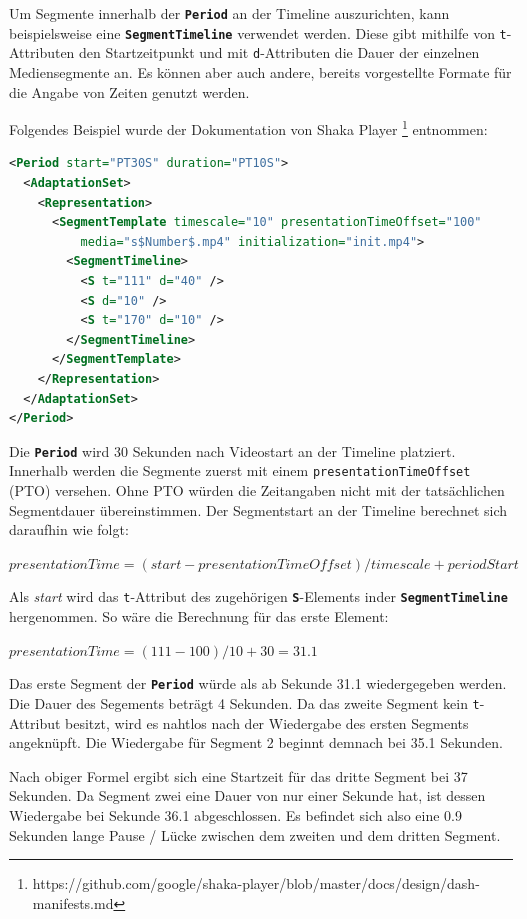 \documentclass[paper = a4, fontsize = 12pt, parskip = half]{scrartcl} %
\def\attr#1{\texttt{#1}}
\def\elem#1{\texttt{\textbf{#1}}}
\begin{document}
Um Segmente innerhalb der \elem{Period} an der Timeline auszurichten, kann beispielsweise eine \elem{SegmentTimeline} verwendet werden. Diese gibt mithilfe von \attr{t}-Attributen den Startzeitpunkt und mit \attr{d}-Attributen die Dauer der einzelnen Mediensegmente an. Es können aber auch andere, bereits vorgestellte Formate für die Angabe von Zeiten genutzt werden.

Folgendes Beispiel wurde der Dokumentation von Shaka Player \footnote{https://github.com/google/shaka-player/blob/master/docs/design/dash-manifests.md} entnommen:

\begin{lstlisting}[language=XML,basicstyle=\small]
<Period start="PT30S" duration="PT10S">
  <AdaptationSet>
    <Representation>
      <SegmentTemplate timescale="10" presentationTimeOffset="100"
          media="s$Number$.mp4" initialization="init.mp4">
        <SegmentTimeline>
          <S t="111" d="40" />
          <S d="10" />
          <S t="170" d="10" />
        </SegmentTimeline>
      </SegmentTemplate>
    </Representation>
  </AdaptationSet>
</Period>
\end{lstlisting}

Die \elem{Period} wird 30 Sekunden nach Videostart an der Timeline platziert. Innerhalb werden die Segmente zuerst mit einem \attr{presentationTimeOffset} (PTO) versehen. Ohne PTO würden die Zeitangaben nicht mit der tatsächlichen Segmentdauer übereinstimmen. Der Segmentstart an der Timeline berechnet sich daraufhin wie folgt:

\begin{center}
	$presentationTime = (start - presentationTimeOffset) / timescale + periodStart$
\end{center}

Als \textit{start} wird das \attr{t}-Attribut des zugehörigen \elem{S}-Elements inder \elem{SegmentTimeline} hergenommen. So wäre die Berechnung für das erste Element:

\begin{center}
	$presentationTime = (111 - 100) / 10 + 30 = 31.1$
\end{center}

Das erste Segment der \elem{Period} würde als ab Sekunde 31.1 wiedergegeben werden. Die Dauer des Segements beträgt 4 Sekunden. Da das zweite Segment kein \attr{t}-Attribut besitzt, wird es nahtlos nach der Wiedergabe des ersten Segments angeknüpft. Die Wiedergabe für Segment 2 beginnt demnach bei 35.1 Sekunden.

Nach obiger Formel ergibt sich eine Startzeit für das dritte Segment bei 37 Sekunden. Da Segment zwei eine Dauer von nur einer Sekunde hat, ist dessen Wiedergabe bei Sekunde 36.1 abgeschlossen. Es befindet sich also eine 0.9 Sekunden lange Pause / Lücke zwischen dem zweiten und dem dritten Segment.
\end{document}
